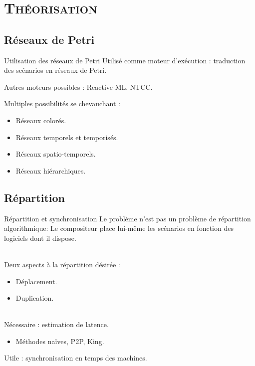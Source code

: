 \section{\scshape Théorisation}
\subsection{Réseaux de Petri}
\begin{frame}{Utilisation des réseaux de Petri}
Utilisé comme moteur d'exécution : traduction des scénarios en réseaux de Petri\cite{allombert2009aspects}.

Autres moteurs possibles : Reactive ML\cite{arias2014modelling}, NTCC\cite{allombert2006concurrent}.

Multiples possibilités se chevauchant :
\begin{itemize}
	\item Réseaux colorés.
	\item Réseaux temporels et temporisés.
	\item Réseaux spatio-temporels.
	\item Réseaux hiérarchiques.
\end{itemize}
\end{frame}

\subsection{Répartition}
\begin{frame}{Répartition et synchronisation}
	Le problème n'est pas un problème de répartition algorithmique:
	Le compositeur place lui-même les scénarios en fonction des logiciels dont il dispose.
	
	~ \\
	Deux aspects à la répartition désirée : 
	\begin{itemize}
		\item Déplacement.
		\item Duplication. 
	\end{itemize}
	~ \\
	Nécessaire : estimation de latence.
	\begin{itemize}
		\item Méthodes naïves, P2P\cite{im2000method}, King\cite{gummadi2002king}.
	\end{itemize}
	
	Utile : synchronisation en temps des machines.
	\begin{itemize}
	\end{itemize}
\end{frame}
